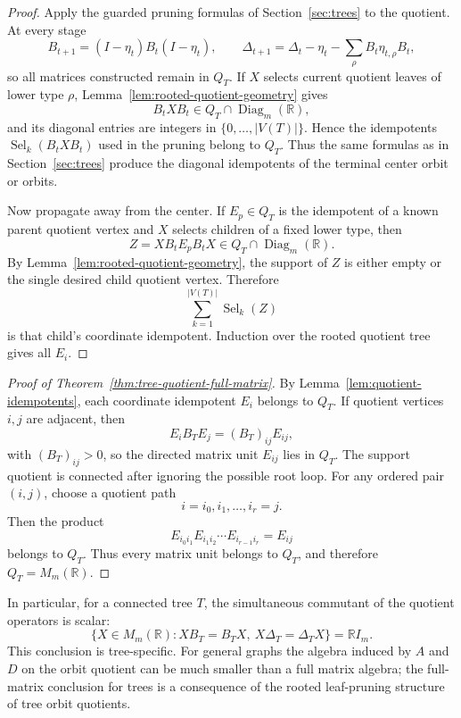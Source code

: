 \documentclass[a4paper,fleqn]{cas-sc}
\theoremstyle{definition}
\theoremstyle{remark}
\newcommand{\R}{\mathbb R}
\newcommand{\Sel}{\operatorname{Sel}}
\begin{document}
\begin{proof}
Apply the guarded pruning formulas of Section~\ref{sec:trees} to the quotient.
At every stage
\[
        B_{t+1}=(I-\eta_t)B_t(I-\eta_t),\qquad
        \Delta_{t+1}=\Delta_t-\eta_t-\sum_\rho B_t\eta_{t,\rho}B_t,
\]
so all matrices constructed remain in \(Q_T\).  If \(X\) selects current quotient
leaves of lower type \(\rho\), Lemma~\ref{lem:rooted-quotient-geometry} gives
\[
        B_tXB_t\in Q_T\cap \operatorname{Diag}_m(\R),
\]
and its diagonal entries are integers in \(\{0,\ldots,|V(T)|\}\).  Hence the
idempotents \(\Sel_k(B_tXB_t)\) used in the pruning belong to \(Q_T\).  Thus the
same formulas as in Section~\ref{sec:trees} produce the diagonal idempotents of
the terminal center orbit or orbits.

Now propagate away from the center.  If \(E_p\in Q_T\) is the idempotent of a
known parent quotient vertex and \(X\) selects children of a fixed lower type,
then
\[
        Z=XB_tE_pB_tX\in Q_T\cap \operatorname{Diag}_m(\R).
\]
By Lemma~\ref{lem:rooted-quotient-geometry}, the support of \(Z\) is either empty
or the single desired child quotient vertex.  Therefore
\[
        \sum_{k=1}^{|V(T)|}\Sel_k(Z)
\]
is that child's coordinate idempotent.  Induction over the rooted quotient tree
gives all \(E_i\).
\end{proof}

\begin{proof}[Proof of Theorem~\ref{thm:tree-quotient-full-matrix}]
By Lemma~\ref{lem:quotient-idempotents}, each coordinate idempotent \(E_i\) belongs to
\(Q_T\).  If quotient vertices \(i,j\) are adjacent, then
\[
        E_iB_TE_j=(B_T)_{ij}E_{ij},
\]
with \((B_T)_{ij}>0\), so the directed matrix unit \(E_{ij}\) lies in \(Q_T\).
The support quotient is connected after ignoring the possible root loop.  For any
ordered pair \((i,j)\), choose a quotient path
\[
        i=i_0,i_1,\ldots,i_r=j.
\]
Then the product
\[
        E_{i_0i_1}E_{i_1i_2}\cdots E_{i_{r-1}i_r}=E_{ij}
\]
belongs to \(Q_T\).  Thus every matrix unit belongs to \(Q_T\), and therefore
\(Q_T=M_m(\R)\).
\end{proof}

In particular, for a connected tree \(T\), the simultaneous commutant of the
quotient operators is scalar:
\[
        \{X\in M_m(\R):XB_T=B_TX,\ X\Delta_T=\Delta_TX\}=\R I_m.
\]
This conclusion is tree-specific.  For general graphs the algebra induced by
\(A\) and \(D\) on the orbit quotient can be much smaller than a full matrix
algebra; the full-matrix conclusion for trees is a consequence of the rooted
leaf-pruning structure of tree orbit quotients.
\end{document}
